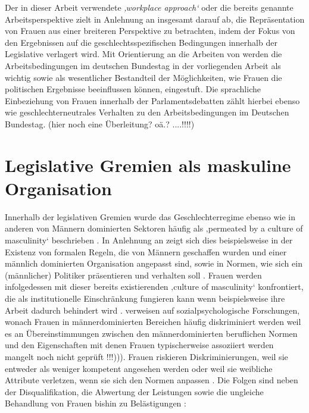\documentclass[12pt, 
    twoside=false, 
    bibliography=totoc, 
    numbers=endperiod, 
    headings=normal, 
    toc=chapterentrydotfill
    ]{scrbook}
\begin{document}
Der in dieser Arbeit verwendete \emph{‚workplace approach‘} oder die bereits genannte Arbeitsperspektive zielt in Anlehnung an \textcite{erikson_2018} insgesamt darauf ab, die Repräsentation von Frauen aus einer breiteren Perspektive zu betrachten, indem der Fokus von den Ergebnissen auf die geschlechtsspezifischen Bedingungen innerhalb der Legislative verlagert wird. Mit Orientierung an die Arbeiten von \textcites{dahlerup_2006}{dahlerup_1988}{erikson_2018} werden die  Arbeitsbedingungen im deutschen Bundestag in der vorliegenden Arbeit als wichtig sowie als wesentlicher Bestandteil der Möglichkeiten, wie Frauen die politischen Ergebnisse beeinflussen können, eingestuft. Die sprachliche Einbeziehung von Frauen innerhalb der Parlamentsdebatten zählt hierbei ebenso wie geschlechterneutrales Verhalten zu den Arbeitsbedingungen im Deutschen Bundestag. (hier noch eine Überleitung? oä.? ....!!!!)

\section{Legislative Gremien als maskuline Organisation }

Innerhalb der legislativen Gremien wurde das Geschlechterregime ebenso wie in anderen von Männern dominierten Sektoren häufig als ‚permeated by a culture of masculinity‘ beschrieben \parencites[200]{erikson_2018}{lovenduski_2005}. In Anlehnung an \textcite{acker_1990} zeigt sich dies beispielsweise in der Existenz von formalen Regeln, die von Männern geschaffen wurden und einer männlich dominierten Organisation angepasst sind, sowie in Normen, wie sich ein (männlicher) Politiker präsentieren und verhalten soll \parencites[200]{erikson_2018}[48]{acker_1990}. Frauen werden infolgedessen mit dieser bereits existierenden ‚culture of masculinity‘ konfrontiert, die als institutionelle Einschränkung fungieren kann wenn beispielsweise ihre Arbeit dadurch behindert wird \parencites[200]{erikson_2018}[47-56]{lovenduski_2005}. \textcite{erikson_2018} verweisen auf sozialpsychologische Forschungen, wonach Frauen in männerdominierten Bereichen häufig diskriminiert werden weil es an Übereinstimmungen zwischen den männerdominierten beruflichen Normen und den Eigenschaften mit denen Frauen typischerweise assoziiert werden mangelt \parencites[vgl.][]{burgess_1999}{eagly_2002}{heilman_2001}{heilman_2004} noch nicht geprüft !!!))). Frauen riskieren Diskriminierungen, weil sie entweder als weniger kompetent angesehen werden oder weil sie weibliche Attribute verletzen, wenn sie sich den Normen anpassen \parencite[200]{erikson_2018}. Die Folgen sind neben der Disqualifikation, die Abwertung der Leistungen sowie die ungleiche Behandlung von Frauen bishin zu Belästigungen \parencites[200]{erikson_2018}{heilman_2001}{burgess_1999}:
\end{document}
